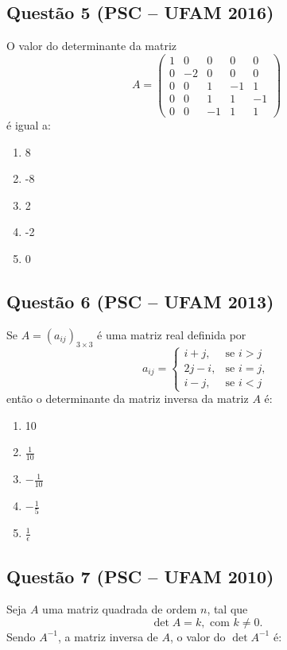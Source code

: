 \documentclass{article}
\begin{document}
\begin{multicols}{2}
		\subsection*{Questão 5 (PSC – UFAM 2016)}
		O valor do determinante da matriz  
		\[
		A = \begin{pmatrix} 1 & 0 & 0 & 0 & 0 \\ 0 & -2 & 0 & 0 & 0 \\ 0 & 0 & 1 & -1 & 1 \\ 0 & 0 & 1 & 1 & -1 \\ 0 & 0 & -1 & 1 & 1 \end{pmatrix}
		\]
		é igual a:
		
		\begin{enumerate}[label=(\Alph*), noitemsep]
			\item 8
			\item -8
			\item 2
			\item -2
			\item 0
		\end{enumerate}
		
		\subsection*{Questão 6 (PSC – UFAM 2013)}
		Se \( A = \left( a_{ij} \right)_{3 \times 3} \) é uma matriz real definida por  
		\[
		a_{ij} = \begin{cases} 
			i + j, & \text{se } i > j \\
			2j - i, & \text{se } i = j, \\
			i - j, & \text{se } i < j
		\end{cases}
		\]
		então o determinante da matriz inversa da matriz \( A \) é:  
		
		\begin{enumerate}[label=(\Alph*), noitemsep]
			\item 10
			\item \(\frac{1}{10}\)
			\item \(-\frac{1}{10}\)
			\item \(-\frac{1}{5}\)
			\item \(\frac{1}{\epsilon}\)
		\end{enumerate}
		
		\subsection*{Questão 7 (PSC – UFAM 2010)}
		Seja \( A \) uma matriz quadrada de ordem \( n \), tal que  
		\[
		\det A = k, \text{ com } k \neq 0. 
		\]  
		Sendo \( A^{-1} \), a matriz inversa de \( A \), o valor do \(\det A^{-1}\) é:  
		

\end{multicols}
\end{document}
